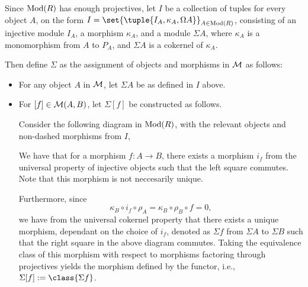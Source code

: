 \begin{definition}
    \label{def:stmod_sigma}
    Since \( \operatorname{Mod}(R) \) has enough projectives, let \( I \) be a collection of tuples for every object \( A \), on the form \( I = \set{\tuple{I_A, \kappa_A, \Omega A}}_{A \in \Mod(R)} \), consisting of an injective module \( I_A \), a morphism \( \kappa_A \), and a module \( \Sigma A \), where \( \kappa_A \) is a monomorphism from \( A \) to \( P_A \), and \( \Sigma A \) is a cokernel of \( \kappa_A \).

    Then define \( \Sigma \) as the assignment of objects and morphisms in \( {\mathcal{M}} \) as follows:
    \begin{itemize}
        \item {
            For any object \( A \) in \( {\mathcal{M}} \), let \( \Sigma A \) be as defined in \( I \) above.
        }
        \item {
            For \( [f] \in {\mathcal{M}}(A, B) \), let \( \Sigma [f] \) be constructed as follows.

            Consider the following diagram in \( \operatorname{Mod}(R) \), with the relevant objects and non-dashed morphisms from \( I \),
            \begin{center}
            \end{center}

            We have that for a morphism \( f: A \to B \), there exists a morphism \( i_f \) from the universal property of injective objects such that the left square commutes. Note that this morphism is not neccesarily unique.

            Furthermore, since
            \[
                \kappa_B \circ i_f \circ \rho_A = \kappa_B \circ \rho_B \circ f = 0,
            \]
            we have from the universal cokernel property that there exists a unique morphism, dependant on the choice of \( i_f \), denoted as \( \Sigma f \) from \( \Sigma A \) to \( \Sigma B \) such that the right square in the above diagram commutes. Taking the equivalence class of this morphism with respect to morphisms factoring through projectives yields the morphism defined by the functor, i.e., \( \Sigma [f] := \class{\Sigma f} \).
        }
    \end{itemize}
\end{definition}

